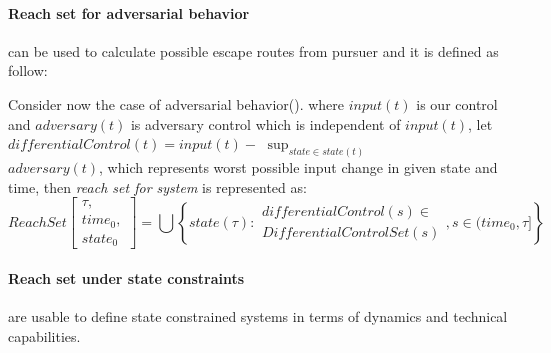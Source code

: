     \paragraph{Reach set for adversarial behavior} can be used to calculate possible escape routes from pursuer and it is defined as follow:

    \begin{definition}
        Consider now the case of adversarial behavior(\cite{game1987,game1988}).
        where $input(t)$ is our control and $adversary(t)$ is adversary control which is independent of $input(t)$, let $differentialControl(t)=input(t)-$ $\sup_{{state} \in state(t)}$\\ $adversary(t)$, which represents worst possible input change in given state and time, then \emph{reach set for system} is represented as:
        \begin{equation}
            ReachSet\left[\begin{gathered}\tau,\\ time_0,\\ state_0\end{gathered}\right] = \bigcup \left\{state(\tau): 
                \begin{aligned}
                    differentialControl(s)\in\\  DifferentialControlSet(s)
                \end{aligned}
            ,s \in (time_0,\tau]\right\}
        \end{equation}
    \end{definition}

    \paragraph{Reach set under state constraints} are usable to define state constrained systems in terms of dynamics and technical capabilities.
    
